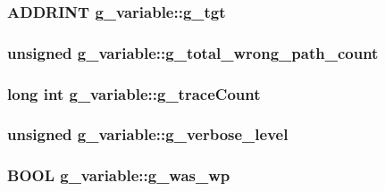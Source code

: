 \label{structg__variable_a992a1e746b4ab8d8ef422b522300f769}
\hypertarget{structg__variable_a34e0ec891cac1d35b52ed384463a0cf9}{
\subsubsection[{g\_\-tgt}]{\setlength{\rightskip}{0pt plus 5cm}ADDRINT {\bf g\_\-variable::g\_\-tgt}}}
\label{structg__variable_a34e0ec891cac1d35b52ed384463a0cf9}
\hypertarget{structg__variable_a155baf9caa1600f209b109f6eebf50eb}{
\subsubsection[{g\_\-total\_\-wrong\_\-path\_\-count}]{\setlength{\rightskip}{0pt plus 5cm}unsigned {\bf g\_\-variable::g\_\-total\_\-wrong\_\-path\_\-count}}}
\label{structg__variable_a155baf9caa1600f209b109f6eebf50eb}
\hypertarget{structg__variable_ad00b3634585f9cc7e89adb907114a290}{
\subsubsection[{g\_\-traceCount}]{\setlength{\rightskip}{0pt plus 5cm}long int {\bf g\_\-variable::g\_\-traceCount}}}
\label{structg__variable_ad00b3634585f9cc7e89adb907114a290}
\hypertarget{structg__variable_ac965e96976bbbeb71833c68438b5fc47}{
\subsubsection[{g\_\-verbose\_\-level}]{\setlength{\rightskip}{0pt plus 5cm}unsigned {\bf g\_\-variable::g\_\-verbose\_\-level}}}
\label{structg__variable_ac965e96976bbbeb71833c68438b5fc47}
\hypertarget{structg__variable_a72fd819583457322714db5dedb07fe69}{
\subsubsection[{g\_\-was\_\-wp}]{\setlength{\rightskip}{0pt plus 5cm}BOOL {\bf g\_\-variable::g\_\-was\_\-wp}}}
